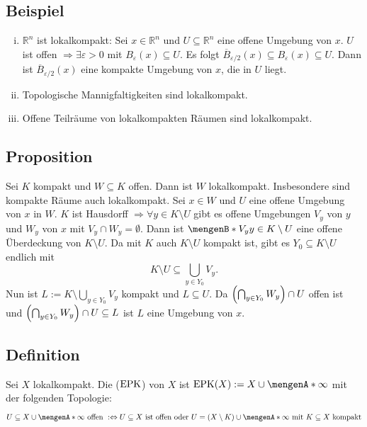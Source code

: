 \subsection[Bespiele für lokalkompakte Hausdorffräume]{Beispiel} %
\label{sub:54}
\begin{enumerate}[(i)]
	\item $\mathds{R}^n$ ist lokalkompakt: Sei $x \in \mathds{R}^n$ und $U \subseteq \mathds{R}^n$ eine offene Umgebung von $x$. $U$ ist offen 
	$\Rightarrow \exists \varepsilon >0$ mit $B_\varepsilon(x) \subseteq U$. Es folgt $\overline{B}_{\varepsilon/2}(x) \subseteq B_\varepsilon(x) \subseteq U $. Dann
	ist $\overline{B}_{\varepsilon/2}(x)$ eine kompakte Umgebung von $x$, die in $U$ liegt.
	\item Topologische Mannigfaltigkeiten sind lokalkompakt.
	\item Offene Teilräume von lokalkompakten Räumen sind lokalkompakt.
\end{enumerate}

\subsection[Proposition: Offene Teilräume kompakter Räume sind lokalkompakt]{Proposition} %
\label{sub:55}
Sei $K$ kompakt und $W \subseteq K$ offen. Dann ist $W$ lokalkompakt. Insbesondere sind kompakte Räume auch lokalkompakt.
Sei $x \in W$ und $U$ eine offene Umgebung von $x$ in $W$. $K$ ist Hausdorff $\Rightarrow \forall y \in K \setminus U$ gibt es offene Umgebungen $V_y$ von $y$ und $W_y$ von 
$x$ mit $V_y \cap W_y = \emptyset$. Dann ist $\set[V_y]{y \in K \setminus U} $ eine offene Überdeckung von $K \setminus U$. Da mit $K$ auch $K \setminus U$ kompakt ist, 
gibt es $Y_0 \subseteq K\setminus U$ endlich mit 
\[
	K\setminus U \subseteq \bigcup_{y \in Y_0} V_y.
\]
Nun ist $L := K \setminus \bigcup_{y \in Y_0} V_y$ kompakt und $L \subseteq U$. Da $\enbrace*{\bigcap_{y \in Y_0} W_y} \cap U$ offen ist und 
$\enbrace*{\bigcap_{y \in Y_0} W_y} \cap U \subseteq  L$ ist $L$ eine Umgebung von $x$. \bewende

\subsection[Definition: Einpunktkompaktifizierung ($\EPK$)]{Definition} %
\label{sub:56}
Sei $X$ lokalkompakt. Die  ($\EPK$) von $X$ ist $\EPK(X) := X \cup \set{\infty}$ mit der folgenden Topologie:
\[
	U \subseteq X \cup \set{\infty} \text{ offen } :\Leftrightarrow U \subseteq X \text{ ist offen oder } U= (X \setminus K) \cup \set{\infty} \text{ mit } K \subseteq X \text{ kompakt}  
\] 

